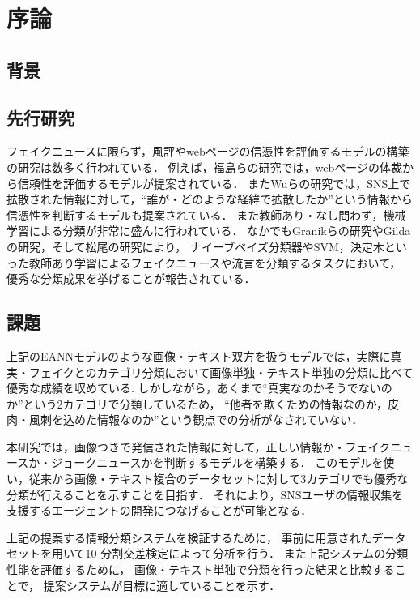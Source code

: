 \chapter{序論}
%
\section{背景}


\section{先行研究}
フェイクニュースに限らず，風評やwebページの信憑性を評価するモデルの構築の研究は数多く行われている．
例えば，福島らの研究\cite{fuk}では，webページの体裁から信頼性を評価するモデルが提案されている．
またWuらの研究\cite{wu}では，SNS上で拡散された情報に対して，``誰が・どのような経緯で拡散したか''という情報から信憑性を判断するモデルも提案されている． 
また教師あり・なし問わず，機械学習による分類が非常に盛んに行われている．
なかでもGranikらの研究\cite{gra}やGildaの研究\cite{gil}，そして松尾の研究\cite{mat}により，
ナイーブベイズ分類器やSVM，決定木といった教師あり学習によるフェイクニュースや流言を分類するタスクにおいて，
優秀な分類成果を挙げることが報告されている．


\section{課題}
上記のEANNモデルのような画像・テキスト双方を扱うモデルでは，実際に真実・フェイクとのカテゴリ分類において画像単独・テキスト単独の分類に比べて優秀な成績を収めている\cite{eann}.\@
しかしながら，あくまで``真実なのかそうでないのか''という2カテゴリで分類しているため，
``他者を欺くための情報なのか，皮肉・風刺を込めた情報なのか''という観点での分析がなされていない．

本研究では，画像つきで発信された情報に対して，正しい情報か・フェイクニュースか・ジョークニュースかを判断するモデルを構築する．
このモデルを使い，従来から画像・テキスト複合のデータセットに対して3カテゴリでも優秀な分類が行えることを示すことを目指す．
それにより，SNSユーザの情報収集を支援するエージェントの開発につなげることが可能となる．

上記の提案する情報分類システムを検証するために，
事前に用意されたデータセットを用いて10 分割交差検定によって分析を行う．
また上記システムの分類性能を評価するために，
画像・テキスト単独で分類を行った結果と比較することで，
提案システムが目標に適していることを示す．

% 
